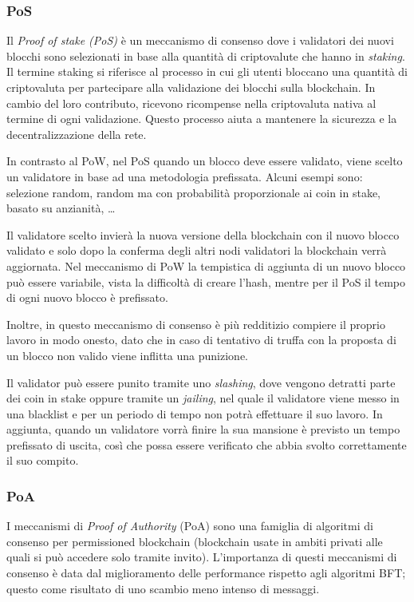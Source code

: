 \subsubsection{PoS}
\label{sec:PoS}

Il \textit{Proof of stake (PoS)} è un meccanismo di consenso dove i validatori dei nuovi blocchi sono selezionati in base alla quantità di criptovalute che hanno in \textit{staking}.
Il termine staking si riferisce al processo in cui gli utenti bloccano una quantità di criptovaluta per partecipare alla validazione dei blocchi sulla blockchain. In cambio del loro contributo, ricevono ricompense nella criptovaluta nativa al termine di ogni validazione. Questo processo aiuta a mantenere la sicurezza e la decentralizzazione della rete. \cite{vitalik-pos}

In contrasto al PoW, nel PoS quando un blocco deve essere validato, viene scelto un validatore in base ad una metodologia prefissata. Alcuni esempi sono: selezione random, random ma con probabilità proporzionale ai coin in stake, basato su anzianità, … \cite{ethereum-pos}
    
Il validatore scelto invierà la nuova versione della blockchain con il nuovo blocco validato e solo dopo la conferma degli altri nodi validatori la blockchain verrà aggiornata. \newline 
Nel meccanismo di PoW la tempistica di aggiunta di un nuovo blocco può essere variabile, vista la difficoltà di creare l'hash, mentre per il PoS il tempo di ogni nuovo blocco è prefissato. \cite{ethereum-pos}

Inoltre, in questo meccanismo di consenso è più redditizio compiere il proprio lavoro in modo onesto, dato che in caso di tentativo di truffa con la proposta di un blocco non valido viene inflitta una punizione. \cite{vitalik-pos}

Il validator può essere punito tramite uno \textit{slashing}, dove vengono detratti parte dei coin in stake oppure tramite un \textit{jailing}, nel quale il validatore viene messo in una blacklist e per un periodo di tempo non potrà effettuare il suo lavoro.
In aggiunta, quando un validatore vorrà finire la sua mansione è previsto un tempo prefissato di uscita, così che possa essere verificato che abbia svolto correttamente il suo compito. \cite{vitalik-pos}

\subsubsection{PoA}
I meccanismi di \textit{Proof of Authority} (PoA) sono una famiglia di algoritmi di consenso per permissioned blockchain (blockchain usate in ambiti privati alle quali si può accedere solo tramite invito). \cite{permissioned-blockchain}
L'importanza di questi meccanismi di consenso è data dal miglioramento delle performance rispetto agli algoritmi BFT; questo come risultato di uno scambio meno intenso di messaggi. \cite{PoA-paper} 

